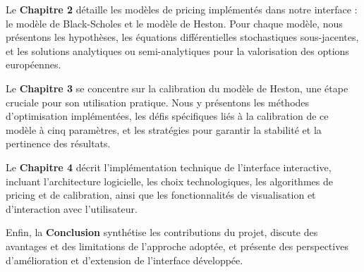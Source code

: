 Le \textbf{Chapitre 2} détaille les modèles de pricing implémentés dans notre interface : le modèle de Black-Scholes et le modèle de Heston. Pour chaque modèle, nous présentons les hypothèses, les équations différentielles stochastiques sous-jacentes, et les solutions analytiques ou semi-analytiques pour la valorisation des options européennes.

Le \textbf{Chapitre 3} se concentre sur la calibration du modèle de Heston, une étape cruciale pour son utilisation pratique. Nous y présentons les méthodes d'optimisation implémentées, les défis spécifiques liés à la calibration de ce modèle à cinq paramètres, et les stratégies pour garantir la stabilité et la pertinence des résultats.

Le \textbf{Chapitre 4} décrit l'implémentation technique de l'interface interactive, incluant l'architecture logicielle, les choix technologiques, les algorithmes de pricing et de calibration, ainsi que les fonctionnalités de visualisation et d'interaction avec l'utilisateur.

Enfin, la \textbf{Conclusion} synthétise les contributions du projet, discute des avantages et des limitations de l'approche adoptée, et présente des perspectives d'amélioration et d'extension de l'interface développée.